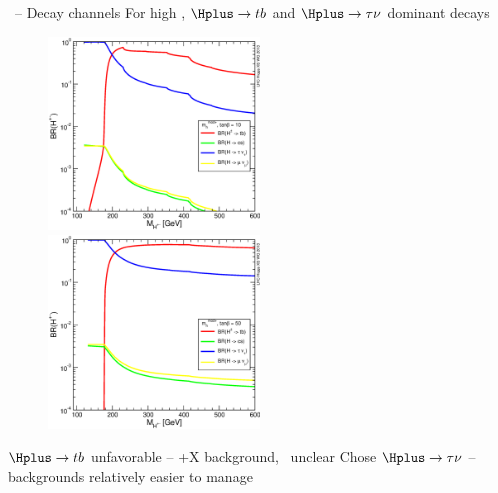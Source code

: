\documentclass[10pt]{beamer}
\begin{document}
\begin{frame}{\Hplus\ -- Decay channels}
\centering
{\large\color{blue} For high \mcH, $\Hplus\to tb$ and $\Hplus\to\tau\nu$ dominant decays}
\begin{figure}
   \includegraphics[width=0.5\textwidth]{figures/YRHXS3_BR_fig33.eps}
   \includegraphics[width=0.5\textwidth]{figures/YRHXS3_BR_fig34.eps}
\end{figure}

\begin{outline}
\1 $\Hplus\to tb$ unfavorable -- \ttbar+X background, \mT\ unclear
\1 Chose $\Hplus\to\tau\nu$ --  backgrounds relatively easier to manage 
\end{outline}
\end{frame}
\end{document}
